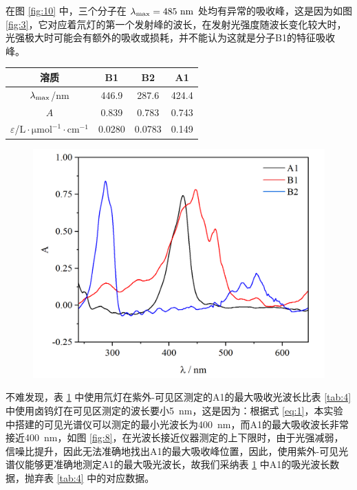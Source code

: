 在图 \ref{fig:10} 中，三个分子在 $\lambda_{\rm max} = 485\mathrm{~nm}$ 处均有异常的吸收峰，这是因为如图 \ref{fig:3}，它对应着氘灯的第一个发射峰的波长，在发射光强度随波长变化较大时，光强极大时可能会有额外的吸收或损耗，并不能认为这就是分子B1的特征吸收峰。

\begin{table}[H]
    \centering
    \begin{tabular}{c|ccc}
    \toprule
     溶质 & B1 & B2 & A1 \\
     \midrule
     $\lambda_{\rm max}$/$\mathrm{nm}$  & 446.9 & 287.6 & 424.4 \\
     $A$ & 0.839 & 0.783 & 0.743 \\
     $\varepsilon$/$\mathrm{L\cdot \mu mol^{-1}\cdot cm^{-1}}$ & 0.0280 & 0.0783 & 0.149 \\
     \bottomrule
    \end{tabular}
    \label{tab:5}
\end{table}


\begin{figure}[H]
    \centering
    \includegraphics[width=.58\textwidth]{figures2/2-7.png}
    \label{fig:11}
\end{figure}

不难发现，表 \ref{tab:5} 中使用氘灯在紫外-可见区测定的A1的最大吸收光波长比表 \ref{tab:4} 中使用卤钨灯在可见区测定的波长要小\SI{5}{nm}，这是因为：根据式 \eqref{eq:1}，本实验中搭建的可见光谱仪可以测定的最小光波长为\SI{400}{nm}，而A1的最大吸收波长非常接近\SI{400}{nm}，如图 \ref{fig:8}，在光波长接近仪器测定的上下限时，由于光强减弱，信噪比提升，因此无法准确地找出A1的最大吸收峰位置，因此，使用紫外-可见光谱仪能够更准确地测定A1的最大吸光波长，故我们采纳表 \ref{tab:5} 中A1的吸光波长数据，抛弃表 \ref{tab:4} 中的对应数据。

